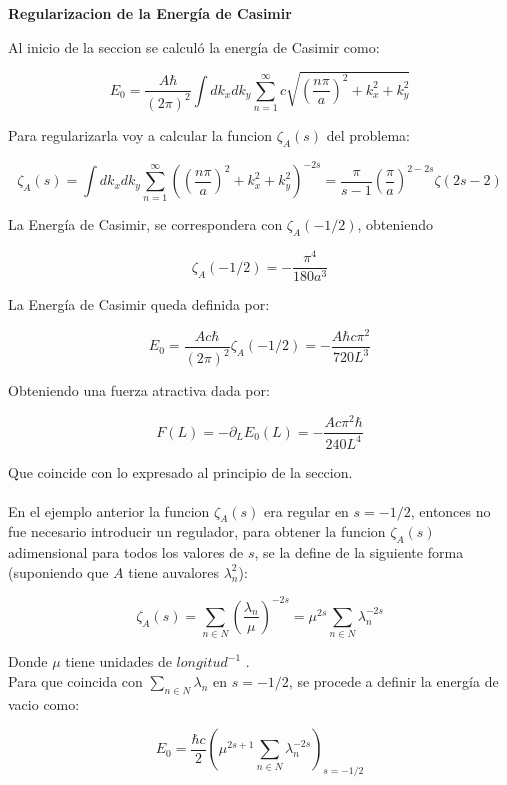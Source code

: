\textbf{Regularizacion de la Energía de Casimir}

Al inicio de la seccion se calculó la energía de Casimir como:

\begin{equation}
E _0 = \frac{A \hbar }{(2 \pi) ^2} \int dk _x dk _y 
\sum _{n=1} ^{\infty} 
c
\sqrt{
		\left( \frac{n \pi}{a } \right) ^2 + k _x ^2 + k _y ^2
		}
\end{equation}

Para regularizarla voy a calcular la funcion $\zeta _A (s)$ del problema:

\begin{equation}
\zeta _A (s) = 
\int dk _x dk _y 
\sum _{n=1} ^{\infty} 
\left(	\left( \frac{n \pi}{a } \right) ^2 + k _x ^2 + k _y ^2
		\right) ^{-2s} = 
\frac{\pi}{s-1} \left( \frac{\pi}{a} \right) ^{2-2s} \zeta (2s-2)
\end{equation}

La Energía de Casimir, se correspondera con $\zeta _A (-1/2)$, obteniendo 


\begin{equation}
\zeta _A (-1/2) = 
- \frac{\pi ^4}{180 a ^3}
\end{equation}

La Energía de Casimir queda definida por:

\begin{equation}
E _0 =  \frac{A c \hbar}{(2 \pi) ^2}
\zeta _A (-1/2) =
- \frac{A \hbar c \pi ^2}
		{720 L ^3}
\end{equation}

Obteniendo una fuerza atractiva dada por:

\begin{equation}
F(L) = - \partial _L E _0 (L) = 
- \frac{A c \pi ^2 \hbar}{240 L^4}
\end{equation}

Que coincide con lo expresado al principio de la seccion. \\ \\


En el ejemplo anterior la funcion $\zeta _A (s) $ era regular en $s= -1/2$, entonces no fue necesario introducir un regulador, para obtener la funcion $\zeta _A (s)$ adimensional para todos los valores de $s$, se la define de la siguiente forma (suponiendo que $A$ tiene auvalores $\lambda _n ^2 $):

\begin{equation}
\zeta _A (s) = \sum _{n \in N} \left( \frac{\lambda _n}{\mu }  \right) ^{-2s } = 
\mu ^{2s} \sum _{n \in N } \lambda _n ^{-2s}
\end{equation}

Donde $\mu $ tiene unidades de $longitud ^{-1}$ . \\

Para que coincida con $\underset{ {n \in N}}{  \sum } \lambda _n$ en $s= -1/2$, se procede a definir la energía de vacio como:

\begin{equation}
E _ 0 = 
\frac{\hbar c}{2 }
\left(
	\mu ^{2s+1} \sum _{n \in N} \lambda _n ^{-2s} 
	\right) _{s=-1/2}
\end{equation}